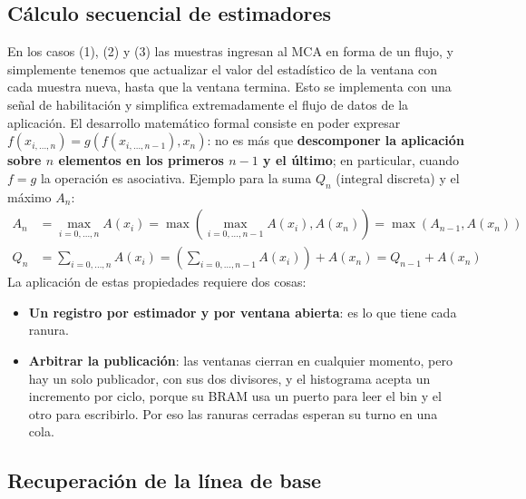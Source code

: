 \subsection{Cálculo secuencial de estimadores}
\label{S:implmca-secuencial}

En los casos (1), (2) y (3) las muestras ingresan al MCA en forma de un flujo, y
simplemente tenemos que actualizar el valor del estadístico de la ventana con
cada muestra nueva, hasta que la ventana termina. Esto se implementa con una
señal de habilitación y simplifica extremadamente el flujo de datos de la
aplicación. El desarrollo matemático formal consiste en poder expresar
$f(x_{i,\ldots, n}) = g( f(x_{i,\ldots, n-1}), x_n)$: no es más que
\textbf{descomponer la aplicación sobre $n$ elementos en los primeros $n-1$ y el
último}; en particular, cuando $f=g$ la operación es asociativa. Ejemplo para la
suma $Q_n$ (integral discreta) y el máximo $A_n$:
\begin{equation}
\begin{aligned}
A_n&= \max_{i=0,\ldots, n} A(x_i) = \max \left( \max_{i=0,\ldots, n-1} A(x_i),
  A(x_n) \right) = \max ( A_{n-1} , A(x_n)) \\
Q_n&= \sum_{i=0,\ldots, n} A(x_i) = \left( \sum_{i=0,\ldots, n-1} A(x_i)
  \right) + A(x_n) = Q_{n-1} + A(x_n)
\end{aligned}
\label{e:implmca-secuencial}
\end{equation}
La aplicación de estas propiedades requiere dos cosas:
\begin{itemize}
  \item \textbf{Un registro por estimador y por ventana abierta}: es lo que
    tiene cada ranura.
  \item \textbf{Arbitrar la publicación}: las ventanas cierran en cualquier
    momento, pero hay un solo publicador, con sus dos divisores, y el histograma
    acepta un incremento por ciclo, porque su BRAM usa un puerto para leer el
    bin y el otro para escribirlo. Por eso las ranuras cerradas esperan su
    turno en una cola.
\end{itemize}

\subsection{Recuperación de la línea de base}
\label{S:implmca-linea-base}

